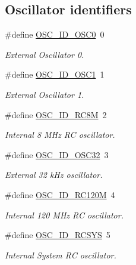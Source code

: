 \subsection*{\-Oscillator identifiers}
\begin{DoxyCompactItemize}
\item 
\#define \hyperlink{group__osc__group_ga6404a3bc67f756a7e6fb9b955f29de68}{\-O\-S\-C\-\_\-\-I\-D\-\_\-\-O\-S\-C0}~0
\begin{DoxyCompactList}\small\item\em \-External \-Oscillator 0. \end{DoxyCompactList}\item 
\#define \hyperlink{group__osc__group_ga9f15ee0e1fcaf29f63532e0334e26232}{\-O\-S\-C\-\_\-\-I\-D\-\_\-\-O\-S\-C1}~1
\begin{DoxyCompactList}\small\item\em \-External \-Oscillator 1. \end{DoxyCompactList}\item 
\#define \hyperlink{group__osc__group_ga37f1cac41a51005a5acdb308f2258bd0}{\-O\-S\-C\-\_\-\-I\-D\-\_\-\-R\-C8\-M}~2
\begin{DoxyCompactList}\small\item\em \-Internal 8 \-M\-Hz \-R\-C oscillator. \end{DoxyCompactList}\item 
\#define \hyperlink{group__osc__group_ga4f4dcbf422a83b362e265e57166b8437}{\-O\-S\-C\-\_\-\-I\-D\-\_\-\-O\-S\-C32}~3
\begin{DoxyCompactList}\small\item\em \-External 32 k\-Hz oscillator. \end{DoxyCompactList}\item 
\#define \hyperlink{group__osc__group_gadd41022df04761b22fd3ad75287839ae}{\-O\-S\-C\-\_\-\-I\-D\-\_\-\-R\-C120\-M}~4
\begin{DoxyCompactList}\small\item\em \-Internal 120 \-M\-Hz \-R\-C oscillator. \end{DoxyCompactList}\item 
\#define \hyperlink{group__osc__group_ga350967f19725f558900579aa34081b08}{\-O\-S\-C\-\_\-\-I\-D\-\_\-\-R\-C\-S\-Y\-S}~5
\begin{DoxyCompactList}\small\item\em \-Internal \-System \-R\-C oscillator. \end{DoxyCompactList}\end{DoxyCompactItemize}

